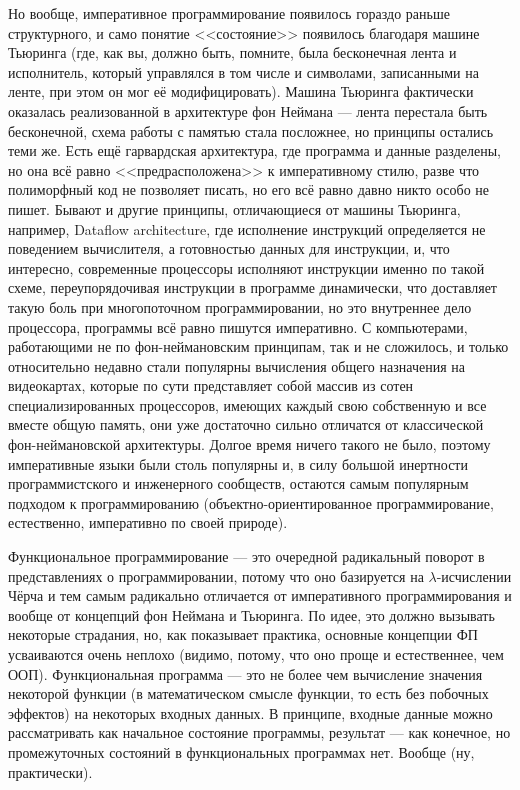 \documentclass{../../text-style}
\begin{document}
Но вообще, императивное программирование появилось гораздо раньше структурного, и само понятие <<состояние>> появилось благодаря машине Тьюринга (где, как вы, должно быть, помните, была бесконечная лента и исполнитель, который управлялся в том числе и символами, записанными на ленте, при этом он мог её модифицировать). Машина Тьюринга фактически оказалась реализованной в архитектуре фон Неймана --- лента перестала быть бесконечной, схема работы с памятью стала посложнее, но принципы остались теми же. Есть ещё гарвардская архитектура, где программа и данные разделены, но она всё равно <<предрасположена>> к императивному стилю, разве что полиморфный код не позволяет писать, но его всё равно давно никто особо не пишет. Бывают и другие принципы, отличающиеся от машины Тьюринга, например, Dataflow architecture, где исполнение инструкций определяется не поведением вычислителя, а готовностью данных для инструкции, и, что интересно, современные процессоры исполняют инструкции именно по такой схеме, переупорядочивая инструкции в программе динамически, что доставляет такую боль при многопоточном программировании, но это внутреннее дело процессора, программы всё равно пишутся императивно. С компьютерами, работающими не по фон-неймановским принципам, так и не сложилось, и только относительно недавно стали популярны вычисления общего назначения на видеокартах, которые по сути представляет собой массив из сотен специализированных процессоров, имеющих каждый свою собственную и все вместе общую память, они уже достаточно сильно отличатся от классической фон-неймановской архитектуры. Долгое время ничего такого не было, поэтому императивные языки были столь популярны и, в силу большой инертности программистского и инженерного сообществ, остаются самым популярным подходом к программированию (объектно-ориентированное программирование, естественно, императивно по своей природе).

Функциональное программирование --- это очередной радикальный поворот в представлениях о программировании, потому что оно базируется на $\lambda$-исчислении Чёрча и тем самым радикально отличается от императивного программирования и вообще от концепций фон Неймана и Тьюринга. По идее, это должно вызывать некоторые страдания, но, как показывает практика, основные концепции ФП усваиваются очень неплохо (видимо, потому, что оно проще и естественнее, чем ООП). Функциональная программа --- это не более чем вычисление значения некоторой функции (в математическом смысле функции, то есть без побочных эффектов) на некоторых входных данных. В принципе, входные данные можно рассматривать как начальное состояние программы, результат --- как конечное, но промежуточных состояний в функциональных программах нет. Вообще (ну, практически).
\end{document}

